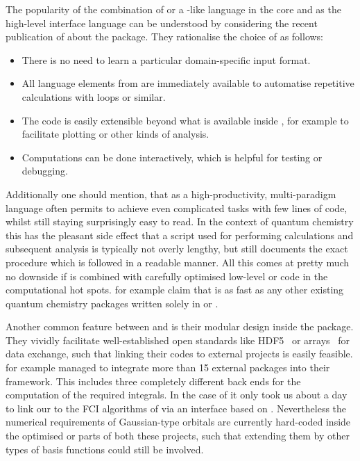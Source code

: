 The popularity of the combination of \fortran or a \ccc-like
language in the core and \python as the high-level interface language
can be understood by considering the recent publication of \citet{Sun2017}
about the \pyscf package.
They rationalise the choice of \python as follows:
\begin{itemize}
	\item There is no need to learn a particular domain-specific
		input format.
	\item All language elements from \python are immediately
		available to \eg automatise repetitive calculations
		with loops or similar.
	\item The code is easily extensible beyond what is available
		inside \pyscf, for example to facilitate plotting
		or other kinds of analysis.
	\item Computations can be done interactively,
		which is helpful for testing or debugging.
\end{itemize}
Additionally one should mention,
that \python as a high-productivity, multi-paradigm language
often permits to achieve even complicated tasks with few lines of code,
whilst still staying surprisingly easy to read.
In the context of quantum chemistry
this has the pleasant side effect that a \python script
used for performing calculations and subsequent analysis
is typically not overly lengthy,
but still documents the exact procedure which is followed in a readable manner.
All this comes at pretty much no downside
if \python is combined with
carefully optimised low-level \ccc or \fortran
code in the computational hot spots.
\citet{Sun2017} for example claim that \pyscf is as
fast as any other existing quantum chemistry packages
written solely in \ccc or \fortran.

Another common feature between \pyscf and \psifour
is their modular design inside the package.
They vividly facilitate well-established open standards
like HDF5~\cite{HDF5Manual} or \numpy arrays~\cite{Walt2011}
for data exchange,
such that linking their codes to external projects is easily feasible.
\psifour for example managed to integrate more than 15 external packages
into their framework.
This includes three completely different back ends for the computation of the
required integrals.
In the case of \pyscf it only took us about a day to link
our \molsturm to the FCI algorithms of \pyscf
via an interface based on \numpy.
Nevertheless the numerical requirements of Gaussian-type orbitals
are currently hard-coded inside the optimised
\ccc or \cpp parts of both these projects,
such that extending them by other types of basis functions could still be involved.

